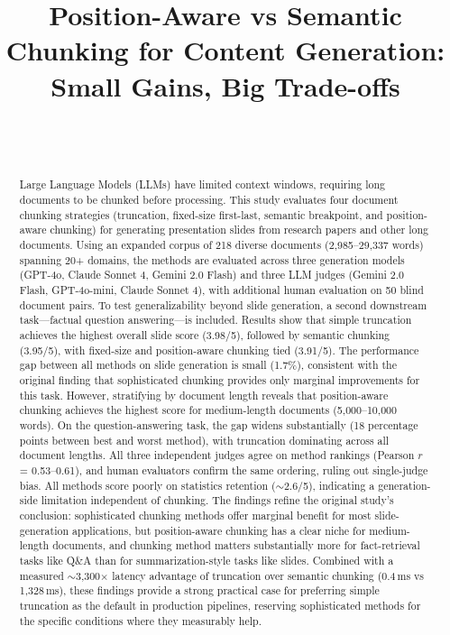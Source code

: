 \documentclass[journal]{IEEEtran}
\begin{document}
\title{Position-Aware vs Semantic Chunking for Content Generation: Small Gains, Big Trade-offs}

\author{\\
\\
}

\maketitle

\begin{abstract}
Large Language Models (LLMs) have limited context windows, requiring long documents to be chunked before processing. This study evaluates four document chunking strategies (truncation, fixed-size first-last, semantic breakpoint, and position-aware chunking) for generating presentation slides from research papers and other long documents. Using an expanded corpus of 218 diverse documents (2{,}985--29{,}337 words) spanning 20+ domains, the methods are evaluated across three generation models (GPT-4o, Claude Sonnet 4, Gemini 2.0 Flash) and three LLM judges (Gemini 2.0 Flash, GPT-4o-mini, Claude Sonnet 4), with additional human evaluation on 50 blind document pairs. To test generalizability beyond slide generation, a second downstream task---factual question answering---is included. Results show that simple truncation achieves the highest overall slide score (3.98/5), followed by semantic chunking (3.95/5), with fixed-size and position-aware chunking tied (3.91/5). The performance gap between all methods on slide generation is small (1.7\%), consistent with the original finding that sophisticated chunking provides only marginal improvements for this task. However, stratifying by document length reveals that position-aware chunking achieves the highest score for medium-length documents (5{,}000--10{,}000 words). On the question-answering task, the gap widens substantially (18 percentage points between best and worst method), with truncation dominating across all document lengths. All three independent judges agree on method rankings (Pearson $r$ = 0.53--0.61), and human evaluators confirm the same ordering, ruling out single-judge bias. All methods score poorly on statistics retention ($\sim$2.6/5), indicating a generation-side limitation independent of chunking. The findings refine the original study's conclusion: sophisticated chunking methods offer marginal benefit for most slide-generation applications, but position-aware chunking has a clear niche for medium-length documents, and chunking method matters substantially more for fact-retrieval tasks like Q\&A than for summarization-style tasks like slides. Combined with a measured $\sim$3{,}300$\times$ latency advantage of truncation over semantic chunking (0.4\,ms vs 1{,}328\,ms), these findings provide a strong practical case for preferring simple truncation as the default in production pipelines, reserving sophisticated methods for the specific conditions where they measurably help.
\end{abstract}
\end{document}
